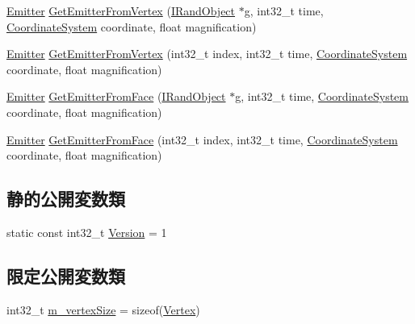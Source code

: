 \begin{DoxyCompactItemize}
\item 
\mbox{\hyperlink{struct_effekseer_1_1_model_1_1_emitter}{Emitter}} \mbox{\hyperlink{class_effekseer_1_1_model_a903c0b92208cebf971846956770fb681}{Get\+Emitter\+From\+Vertex}} (\mbox{\hyperlink{class_effekseer_1_1_i_rand_object}{I\+Rand\+Object}} $\ast$g, int32\+\_\+t time, \mbox{\hyperlink{namespace_effekseer_ac8508f8823c5fcf36aac5d2ddee23765}{Coordinate\+System}} coordinate, float magnification)
\item 
\mbox{\hyperlink{struct_effekseer_1_1_model_1_1_emitter}{Emitter}} \mbox{\hyperlink{class_effekseer_1_1_model_a0cdeb0635f63e2697bb82f74c8c40aef}{Get\+Emitter\+From\+Vertex}} (int32\+\_\+t index, int32\+\_\+t time, \mbox{\hyperlink{namespace_effekseer_ac8508f8823c5fcf36aac5d2ddee23765}{Coordinate\+System}} coordinate, float magnification)
\item 
\mbox{\hyperlink{struct_effekseer_1_1_model_1_1_emitter}{Emitter}} \mbox{\hyperlink{class_effekseer_1_1_model_aef7548be4adad150a7f573ac977d89c7}{Get\+Emitter\+From\+Face}} (\mbox{\hyperlink{class_effekseer_1_1_i_rand_object}{I\+Rand\+Object}} $\ast$g, int32\+\_\+t time, \mbox{\hyperlink{namespace_effekseer_ac8508f8823c5fcf36aac5d2ddee23765}{Coordinate\+System}} coordinate, float magnification)
\item 
\mbox{\hyperlink{struct_effekseer_1_1_model_1_1_emitter}{Emitter}} \mbox{\hyperlink{class_effekseer_1_1_model_a1bd509af3054aeee73aaf495732e3f4a}{Get\+Emitter\+From\+Face}} (int32\+\_\+t index, int32\+\_\+t time, \mbox{\hyperlink{namespace_effekseer_ac8508f8823c5fcf36aac5d2ddee23765}{Coordinate\+System}} coordinate, float magnification)
\end{DoxyCompactItemize}
\subsection*{静的公開変数類}
\begin{DoxyCompactItemize}
\item 
static const int32\+\_\+t \mbox{\hyperlink{class_effekseer_1_1_model_a9f5c2f10fde65efeb5bc603ed9d6436e}{Version}} = 1
\end{DoxyCompactItemize}
\subsection*{限定公開変数類}
\begin{DoxyCompactItemize}
\item 
int32\+\_\+t \mbox{\hyperlink{class_effekseer_1_1_model_a94c5608140d79abf8280b67df12a6060}{m\+\_\+vertex\+Size}} = sizeof(\mbox{\hyperlink{struct_effekseer_1_1_model_1_1_vertex}{Vertex}})
\end{DoxyCompactItemize}
